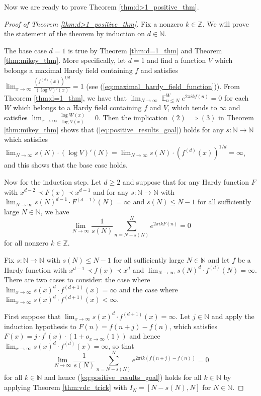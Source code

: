 \documentclass[12pt]{article}
\theoremstyle{plain} %
\theoremstyle{definition} %
\theoremstyle{plain}
\theoremstyle{plain}
\numberwithin{equation}{section}
\newcommand{\N}{\mathbb{N}}
\newcommand{\Z}{\mathbb{Z}}
\renewcommand{\leq}{\leqslant}
\renewcommand{\geq}{\geqslant}
\newcommand{\1}{\mathbbm{1}}
\newcommand{\E}{\operatorname{\mathbb{E}}}
\newcommand{\oo}{\infty}
\begin{document}
Now we are ready to prove Theorem \ref{thm:d>1_positive_thm}. 

\begin{proof}[Proof of Theorem \ref{thm:d>1_positive_thm}]

Fix a nonzero $k\in \Z$. We will prove the statement of the theorem by induction on $d\in \N$.

The base case $d=1$ is true by Theorem \ref{thm:d=1_thm} and Theorem \ref{thm:mikey_thm}. More specifically, let $d=1$ and find a function $V$ which belongs a maximal Hardy field containing $f$ and satisfies $\lim_{x\to\oo}\frac{(f^{(d)}(x))^{1/d}}{(\log V)'(x)}=1$ (see (\ref{eq:maximal_hardy_field_function})). From Theorem \ref{thm:d=1_thm}, we have that $\lim_{N\to\oo}\E_{n\leq N}^We^{2\pi i kf(n)}=0$ for each $W$ which belongs to a Hardy field containing $f$ and $V$, which tends to $\oo$ and satisfies $\lim_{x\to\oo}\frac{\log W(x)}{\log V(x)} = 0$. Then the implication $(2)\implies (3)$ in Theorem \ref{thm:mikey_thm} shows that (\ref{eq:positive_results_goal}) holds for any $s:\N\rightarrow \N$ which satisfies $\lim_{N\to\oo}s(N)\cdot (\log V)'(N) = \lim_{N\to\oo}s(N)\cdot (f^{(d)}(x))^{1/d} = \oo$, and this shows that the base case holds.


Now for the induction step. 
Let $d\geq 2$ and suppose that for any Hardy function $F$ with $x^{d-2}\prec F(x)\prec x^{d-1}$ and for any $s:\N\rightarrow \N$ with 
    $\lim_{N\to\oo}s(N)^{d-1}\cdot F^{(d-1)}(N)=\oo$ and $s(N)\leq N-1$ for all sufficiently large $N\in\N$, we have 
    \begin{equation*}
    \lim_{N\to\oo}\frac{1}{s(N)}\sum_{n=N-s(N)}^Ne^{2\pi i kF(n)}=0
\end{equation*}
    for all nonzero $k\in \Z$.

Fix $s:\N\rightarrow \N$ with $s(N)\leq N-1$ for all sufficiently large $N\in\N$ and let $f$ be a Hardy function with $x^{d-1}\prec f(x)\prec x^d$ and $\lim_{N\to\oo}s(N)^d\cdot f^{(d)}(N)=\oo$. There are two cases to consider: the case where $\lim_{x\to\oo}s(x)^{d}\cdot f^{(d+1)}(x)=\oo$ and the case where $\lim_{x\to\oo}s(x)^{d}\cdot f^{(d+1)}(x)<\oo$.


First suppose that $\lim_{x\to\oo}s(x)^{d}\cdot f^{(d+1)}(x)=\oo$. Let $j\in \N$ and apply the induction hypothesis to $F(n)=f(n+j)-f(n)$, which satisfies $F(x) = j\cdot f^{'}(x)\cdot (1+o_{x\to\oo}(1))$ and hence $\lim_{x\to\oo}s(x)^{d}\cdot f^{(d)}(x)=\oo$, so that 
$$
\lim_{N\to\oo}\frac{1}{s(N)}\sum_{n=N-s(N)}^Ne^{2\pi i k (f(n+j)-f(n))}=0
$$
for all $k\in \N$ and hence (\ref{eq:positive_results_goal}) holds for all $k\in \N$ by applying Theorem \ref{thm:vdc_trick} with $I_{N} = [N-s(N),N]$ for $N\in \N$.


\end{proof}
\end{document}
